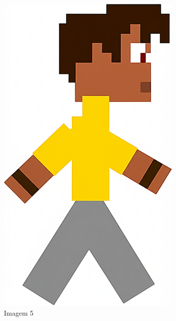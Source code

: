 \begin{figure}[htbp]
\begin{subfigure}{0.23\linewidth}
        \includegraphics[width=1\linewidth]{figs/geminiPro/chat10/tela1_res2_5.PNG}
        \caption{\small Imagem 5}
        \label{fig:geminiProSheet5_2e}
    \end{subfigure}
    \begin{subfigure}{0.23\linewidth}

\end{subfigure}
\end{figure}
